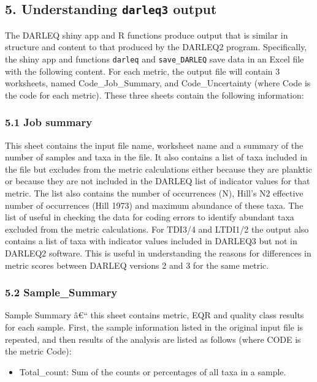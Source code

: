 \documentclass[]{article}
\newcommand{\euro}{€}
\providecommand{\tightlist}{%
  \setlength{\itemsep}{0pt}\setlength{\parskip}{0pt}}
\begin{document}
\subsection{\texorpdfstring{5. Understanding \texttt{darleq3}
output}{5. Understanding darleq3 output}}\label{understanding-darleq3-output}

The DARLEQ shiny app and R functions produce output that is similar in
structure and content to that produced by the DARLEQ2 program.
Specifically, the shiny app and functions \texttt{darleq} and
\texttt{save\_DARLEQ} save data in an Excel file with the following
content. For each metric, the output file will contain 3 worksheets,
named Code\_Job\_Summary, and Code\_Uncertainty (where Code is the code
for each metric). These three sheets contain the following information:

\subsubsection{5.1 Job summary}\label{job-summary}

This sheet contains the input file name, worksheet name and a summary of
the number of samples and taxa in the file. It also contains a list of
taxa included in the file but excludes from the metric calculations
either because they are planktic or because they are not included in the
DARLEQ list of indicator values for that metric. The list also contains
the number of occurrences (N), Hill's N2 effective number of occurrences
(Hill 1973) and maximum abundance of these taxa. The list of useful in
checking the data for coding errors to identify abundant taxa excluded
from the metric calculations. For TDI3/4 and LTDI1/2 the output also
contains a list of taxa with indicator values included in DARLEQ3 but
not in DARLEQ2 software. This is useful in understanding the reasons for
differences in metric scores between DARLEQ versions 2 and 3 for the
same metric.

\subsubsection{5.2 Sample\_Summary}\label{sample_summary}

Sample Summary â\euro{}`` this sheet contains metric, EQR and quality
class results for each sample. First, the sample information listed in
the original input file is repeated, and then results of the analysis
are listed as follows (where CODE is the metric Code):

\begin{itemize}
\tightlist
\item
  Total\_count: Sum of the counts or percentages of all taxa in a
  sample.
\end{itemize}
\end{document}
